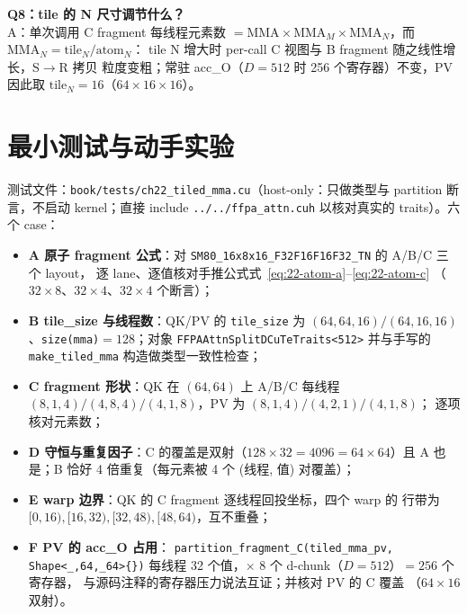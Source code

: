\textbf{Q8：tile 的 N 尺寸调节什么？}\\
A：单次调用 C fragment 每线程元素数 $=\mathrm{MMA}\times\mathrm{MMA}_M\times
\mathrm{MMA}_N$，而 $\mathrm{MMA}_N = \mathrm{tile}_N/\mathrm{atom}_N$：
tile N 增大时 per-call C 视图与 B fragment 随之线性增长，S$\to$R 拷贝
粒度变粗；常驻 acc\_O（$D=512$ 时 256 个寄存器）不变，PV 因此取
$\mathrm{tile}_N=16$（$64\times16\times16$）。

\section{最小测试与动手实验}

测试文件：\texttt{book/\allowbreak{}tests/\allowbreak{}ch22\_\allowbreak{}tiled\_\allowbreak{}mma.cu}（host-only：只做类型与
partition 断言，不启动 kernel；直接 include
\texttt{.\allowbreak{}.\allowbreak{}/\allowbreak{}.\allowbreak{}.\allowbreak{}/\allowbreak{}ffpa\_\allowbreak{}attn.\allowbreak{}cuh} 以核对真实的 traits）。六个 case：

\begin{itemize}
  \item \textbf{A 原子 fragment 公式}：对
        \texttt{SM80\_\allowbreak{}16x8x16\_\allowbreak{}F32\allowbreak{}F16\allowbreak{}F16\allowbreak{}F32\_\allowbreak{}TN} 的 A/B/C 三个 layout，
        逐 lane、逐值核对手推公式式~\eqref{eq:22-atom-a}--\eqref{eq:22-atom-c}
        （$32\times8$、$32\times4$、$32\times4$ 个断言）；
  \item \textbf{B tile\_size 与线程数}：QK/PV 的 \texttt{tile\_size} 为
        $(64,64,16)/(64,16,16)$、\texttt{size(mma)}$=128$；对象
        \texttt{FFPAAttn\allowbreak{}Split\allowbreak{}DCu\allowbreak{}Te\allowbreak{}Traits\allowbreak{}<512>}
        并与手写的
        \texttt{make\_\allowbreak{}tiled\_\allowbreak{}mma} 构造做类型一致性检查；
  \item \textbf{C fragment 形状}：QK 在 $(64,64)$ 上 A/B/C 每线程
        $(8,1,4)/(4,8,4)/(4,1,8)$，PV 为 $(8,1,4)/(4,2,1)/(4,1,8)$；
        逐项核对元素数；
  \item \textbf{D 守恒与重复因子}：C 的覆盖是双射（$128\times32=4096=
        64\times64$）且 A 也是；B 恰好 4 倍重复（每元素被 4 个
        (线程, 值) 对覆盖）；
  \item \textbf{E warp 边界}：QK 的 C fragment 逐线程回投坐标，四个 warp 的
        行带为 $[0,16),[16,32),[32,48),[48,64)$，互不重叠；
  \item \textbf{F PV 的 acc\_O 占用}：
        \texttt{partition\_\allowbreak{}fragment\_\allowbreak{}C\allowbreak{}(tiled\_\allowbreak{}mma\_\allowbreak{}pv,\allowbreak{} Shape\allowbreak{}<\_\allowbreak{},\allowbreak{}64,\allowbreak{}\_\allowbreak{}64>\{\})}
        每线程 32 个值，$\times$ 8 个 d-chunk（$D=512$）$=256$ 个寄存器，
        与源码注释的寄存器压力说法互证；并核对 PV 的 C 覆盖
        （$64\times16$ 双射）。
\end{itemize}

